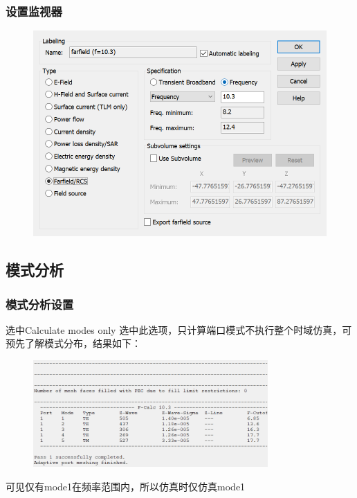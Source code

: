 \documentclass{../source/zjureport}
\begin{document}
            \subsubsection{设置监视器}
            \begin{figure}[thp]
                \centering
                \includegraphics[]{figure/设置监视器.png}
            \end{figure}
        \subsection{模式分析}
            \subsubsection{模式分析设置}
            选中Calculate modes only 选中此选项，只计算端口模式不执行整个时域仿真，可预先了解模式分布，结果如下：
            \begin{figure}[htp]
                \centering
                \includegraphics[width = 0.8\textwidth]{figure/端口分析结果.png}
            \end{figure}

            可见仅有mode1在频率范围内，所以仿真时仅仿真mode1
\end{document}
